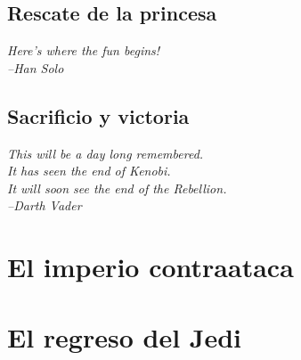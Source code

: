 \documentclass[11pt,a4paper,twoside]{tesis}
\begin{document}
\section{Rescate de la princesa}
{\begin{small}%
\begin{flushright}%
\it
Here's where the fun begins!\\
--Han Solo
\end{flushright}%
\end{small}%
\vspace{.5cm}}

\section{Sacrificio y victoria}
{\begin{small}%
\begin{flushright}%
\it
This will be a day long remembered.\\ It has seen the end of Kenobi.\\ It will soon see the end of the Rebellion.\\
--Darth Vader
\end{flushright}%
\end{small}%
\vspace{.5cm}}

\chapter{El imperio contraataca}
\chapter{El regreso del Jedi}

\backmatter

%
%

\end{document}
